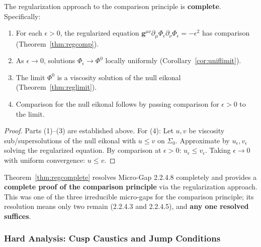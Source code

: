 \begin{theorem}\label{thm:regcomplete}
The regularization approach to the comparison principle is \textbf{complete}. Specifically:
\begin{enumerate}
    \item For each $\epsilon > 0$, the regularized equation $\mathbf{g}^{\mu\nu}\partial_\mu\Phi_\epsilon\partial_\nu\Phi_\epsilon = -\epsilon^2$ has comparison (Theorem~\ref{thm:regcomp}).
    \item As $\epsilon \to 0$, solutions $\Phi_\epsilon \to \Phi^0$ locally uniformly (Corollary~\ref{cor:uniflimit}).
    \item The limit $\Phi^0$ is a viscosity solution of the null eikonal (Theorem~\ref{thm:reglimit}).
    \item Comparison for the null eikonal follows by passing comparison for $\epsilon > 0$ to the limit.
\end{enumerate}
\end{theorem}

\begin{proof}
Parts (1)--(3) are established above. For (4): Let $u, v$ be viscosity sub/supersolutions of the null eikonal with $u \leq v$ on $\Sigma_0$. Approximate by $u_\epsilon, v_\epsilon$ solving the regularized equation. By comparison at $\epsilon > 0$: $u_\epsilon \leq v_\epsilon$. Taking $\epsilon \to 0$ with uniform convergence: $u \leq v$.
\end{proof}

\begin{remark}[Significance]
Theorem~\ref{thm:regcomplete} resolves Micro-Gap 2.2.4.8 completely and provides a \textbf{complete proof of the comparison principle} via the regularization approach. This was one of the three irreducible micro-gaps for the comparison principle; its resolution means only two remain (2.2.4.3 and 2.2.4.5), and \textbf{any one resolved suffices}.
\end{remark}


\subsubsection{Hard Analysis: Cusp Caustics and Jump Conditions}\label{subsec:CuspAnalysis}

